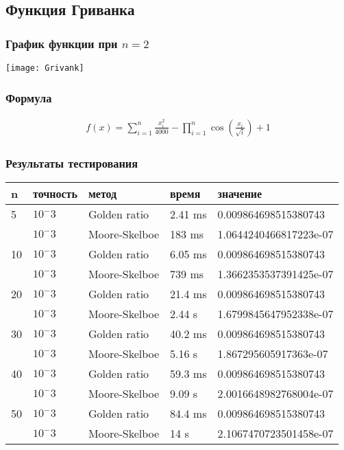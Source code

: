     \subsection*{Функция Гриванка}

    \subsubsection*{График функции при $n=2$}
    \texttt{[image: Grivank]}

    \subsubsection*{Формула}
    \begin{gather*}
        f(x)=\sum_{i=1}^n \frac{x_i^2}{4000}-\prod_{i=1}^n \cos \left(\frac{x_i}{\sqrt{i}}\right)+1
    \end{gather*}

    \subsubsection*{Результаты тестирования}

    \begin{tabular}{ |p{2cm}|p{2cm}|p{3cm}|p{2cm}|p{4cm}|  }
        \hline
        n  & точность & метод         & время   & значение               \\
        \hline
        5  & $10^-3$  & Golden ratio  & 2.41 ms & 0.009864698515380743   \\\cline{2-5}
        & $10^-3$  & Moore-Skelboe & 183 ms  & 1.0644240466817223e-07 \\
        \hline
        10 & $10^-3$  & Golden ratio  & 6.05 ms & 0.009864698515380743   \\\cline{2-5}
        & $10^-3$  & Moore-Skelboe & 739 ms  & 1.3662353537391425e-07 \\
        \hline
        20 & $10^-3$  & Golden ratio  & 21.4 ms & 0.009864698515380743   \\\cline{2-5}
        & $10^-3$  & Moore-Skelboe & 2.44 s  & 1.6799845647952338e-07 \\
        \hline
        30 & $10^-3$  & Golden ratio  & 40.2 ms & 0.009864698515380743   \\\cline{2-5}
        & $10^-3$  & Moore-Skelboe & 5.16 s  & 1.867295605917363e-07  \\
        \hline
        40 & $10^-3$  & Golden ratio  & 59.3 ms & 0.009864698515380743   \\\cline{2-5}
        & $10^-3$  & Moore-Skelboe & 9.09 s  & 2.0016648982768004e-07 \\
        \hline
        50 & $10^-3$  & Golden ratio  & 84.4 ms & 0.009864698515380743   \\\cline{2-5}
        & $10^-3$  & Moore-Skelboe & 14 s    & 2.1067470723501458e-07 \\
        \hline

    \end{tabular}

